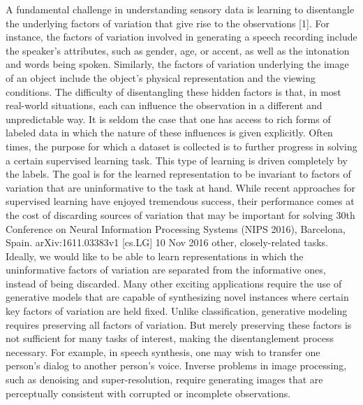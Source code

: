 A fundamental challenge in understanding sensory data is learning to disentangle the underlying
factors of variation that give rise to the observations [1]. For instance, the factors of variation involved
in generating a speech recording include the speaker’s attributes, such as gender, age, or accent, as
well as the intonation and words being spoken. Similarly, the factors of variation underlying the image
of an object include the object’s physical representation and the viewing conditions. The difficulty
of disentangling these hidden factors is that, in most real-world situations, each can influence the
observation in a different and unpredictable way. It is seldom the case that one has access to rich
forms of labeled data in which the nature of these influences is given explicitly.\cite{Mathieu2016}
Often times, the purpose for which a dataset is collected is to further progress in solving a certain
supervised learning task. This type of learning is driven completely by the labels. The goal is for
the learned representation to be invariant to factors of variation that are uninformative to the task
at hand. While recent approaches for supervised learning have enjoyed tremendous success, their
performance comes at the cost of discarding sources of variation that may be important for solving
30th Conference on Neural Information Processing Systems (NIPS 2016), Barcelona, Spain.
arXiv:1611.03383v1 [cs.LG] 10 Nov 2016\cite{Mathieu2016}
other, closely-related tasks. Ideally, we would like to be able to learn representations in which the
uninformative factors of variation are separated from the informative ones, instead of being discarded.
Many other exciting applications require the use of generative models that are capable of synthesizing
novel instances where certain key factors of variation are held fixed. Unlike classification, generative
modeling requires preserving all factors of variation. But merely preserving these factors is not
sufficient for many tasks of interest, making the disentanglement process necessary. For example,
in speech synthesis, one may wish to transfer one person’s dialog to another person’s voice. Inverse
problems in image processing, such as denoising and super-resolution, require generating images that
are perceptually consistent with corrupted or incomplete observations.\cite{Mathieu2016}

